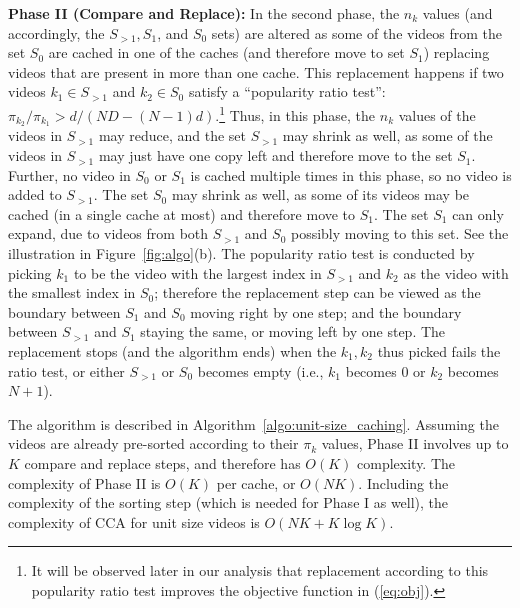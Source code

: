 \documentclass[conference]{IEEEtran}
\begin{document}
\noindent \textbf{Phase II (Compare and Replace):} 
In the second phase, the $n_k$ values (and accordingly, the $S_{>1}, S_1$, and $S_0$ sets) are altered as some of the videos from the set $S_0$ are cached in one of the caches (and therefore move to set $S_1$) replacing videos that are present in more than one cache. This replacement happens if two videos $k_1 \in S_{>1}$ and $k_2 \in S_0$ satisfy a ``popularity ratio test'': $\pi_{k_2}/\pi_{k_1} > d/(ND - (N-1)d)$.\footnote{It will be observed later in our analysis that replacement according to this popularity ratio test improves the objective function in (\ref{eq:obj}).} Thus, in this phase, the $n_k$ values of the videos in $S_{>1}$ may reduce, and the set $S_{>1}$ may shrink as well, as some of the videos in $S_{>1}$ may just have one copy left and therefore move to the set $S_1$. Further, no video in $S_0$ or $S_1$ is cached multiple times in this phase, so no video is added to $S_{>1}$. The set $S_0$ may shrink as well, as some of its videos may be cached (in a single cache at most) and therefore move to $S_1$. The set $S_1$ can only expand, due to videos from both $S_{>1}$ and $S_0$ possibly moving to this set. See the illustration in Figure~\ref{fig:algo}(b). The popularity ratio test is conducted by picking $k_1$ to be the video with the largest index in $S_{>1}$ and $k_2$ as the video with the smallest index in $S_0$; therefore the replacement step can be viewed as the boundary between $S_1$ and $S_0$ moving right by one step; and the boundary between $S_{>1}$ and $S_1$ staying the same, or moving left by one step. The replacement stops (and the algorithm ends) when the $k_1, k_2$ thus picked fails the ratio test, or either $S_{>1}$ or $S_0$ becomes empty (i.e., $k_1$ becomes $0$ or $k_2$ becomes $N+1$).

The algorithm is described in Algorithm~\ref{algo:unit-size_caching}. Assuming the videos are already pre-sorted according to their $\pi_k$ values, Phase II involves up to $K$ compare and replace steps, and therefore has $O(K)$ complexity. The complexity of Phase II is $O(K)$ per cache, or $O(NK)$.
Including the complexity of the sorting step (which is needed for Phase I as well), the complexity of CCA for unit size videos is $O(NK + K \log K)$.
\end{document}
